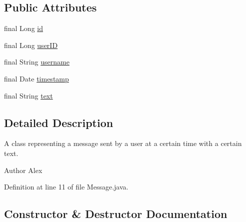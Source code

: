 \subsection*{Public Attributes}
\begin{DoxyCompactItemize}
\item 
final Long \hyperlink{classpt_1_1up_1_1fe_1_1lpro1613_1_1sharedlib_1_1structs_1_1_message_a4a07e278bc5c3189bc9bea184f64f30f}{id}
\item 
final Long \hyperlink{classpt_1_1up_1_1fe_1_1lpro1613_1_1sharedlib_1_1structs_1_1_message_a1d8ccfc6ffc283441cd73b8a915a9ac6}{user\+ID}
\item 
final String \hyperlink{classpt_1_1up_1_1fe_1_1lpro1613_1_1sharedlib_1_1structs_1_1_message_a3c1e06e2767c238a3f508d5c3857f9a2}{username}
\item 
final Date \hyperlink{classpt_1_1up_1_1fe_1_1lpro1613_1_1sharedlib_1_1structs_1_1_message_ab239d2ff2fc6896df1b006a4e61d2606}{timestamp}
\item 
final String \hyperlink{classpt_1_1up_1_1fe_1_1lpro1613_1_1sharedlib_1_1structs_1_1_message_a34a1763aeacd9c6d6c6e80463af8ed3c}{text}
\end{DoxyCompactItemize}


\subsection{Detailed Description}
A class representing a message sent by a user at a certain time with a certain text.

\begin{DoxyAuthor}{Author}
Alex 
\end{DoxyAuthor}


Definition at line 11 of file Message.\+java.



\subsection{Constructor \& Destructor Documentation}
\hypertarget{classpt_1_1up_1_1fe_1_1lpro1613_1_1sharedlib_1_1structs_1_1_message_aef5386b1eef2600650dc0b16adf9c5f7}{}\label{classpt_1_1up_1_1fe_1_1lpro1613_1_1sharedlib_1_1structs_1_1_message_aef5386b1eef2600650dc0b16adf9c5f7} 
